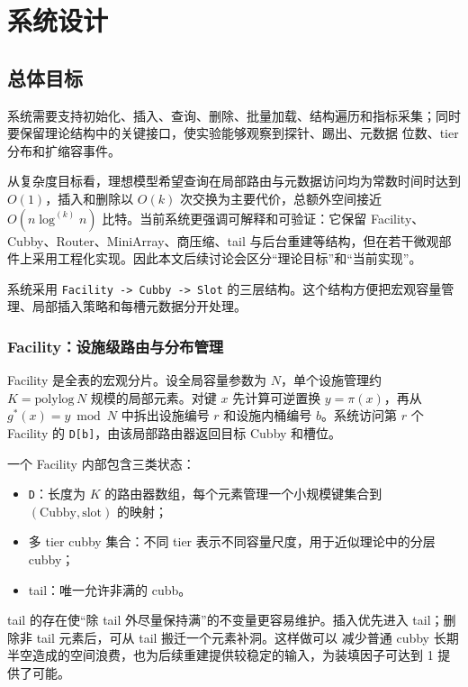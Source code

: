\chapter{系统设计}
\label{ch:design}

\section{总体目标}
系统需要支持初始化、插入、查询、删除、批量加载、结构遍历和指标采集；同时要保留理论结构中的关键接口，使实验能够观察到探针、踢出、元数据
位数、tier 分布和扩缩容事件。

从复杂度目标看，理想模型希望查询在局部路由与元数据访问均为常数时间时达到 \(O(1)\)，插入和删除以 \(O(k)\) 次交换为主要代价，总额外空间接近 \(O(n\log^{(k)}n)\) 比特\cite{pagh2021otsh}。当前系统更强调可解释和可验证：它保留 Facility、Cubby、Router、MiniArray、商压缩、tail 与后台重建等结构，但在若干微观部件上采用工程化实现。因此本文后续讨论会区分“理论目标”和“当前实现”。

系统采用 \texttt{Facility -> Cubby -> Slot} 的三层结构。这个结构方便把宏观容量管理、局部插入策略和每槽元数据分开处理。

\subsection{Facility：设施级路由与分布管理}
Facility 是全表的宏观分片。设全局容量参数为 \(N\)，单个设施管理约 \(K=\mathrm{polylog}\,N\) 规模的局部元素。对键 \(x\) 先计算可逆置换 \(y=\pi(x)\)，再从 \(g^\ast(x)=y\bmod N\) 中拆出设施编号 \(r\) 和设施内桶编号 \(b\)。系统访问第 \(r\) 个 Facility 的 \texttt{D[b]}，由该局部路由器返回目标 Cubby 和槽位。

一个 Facility 内部包含三类状态：
\begin{itemize}
  \item \texttt{D}：长度为 \(K\) 的路由器数组，每个元素管理一个小规模键集合到 \((\mathrm{Cubby},\mathrm{slot})\) 的映射；
  \item 多 tier cubby 集合：不同 tier 表示不同容量尺度，用于近似理论中的分层 cubby；
  \item tail：唯一允许非满的 cubb。
\end{itemize}

tail 的存在使“除 tail 外尽量保持满”的不变量更容易维护。插入优先进入 tail；删除非 tail 元素后，可从 tail 搬迁一个元素补洞。这样做可以
减少普通 cubby 长期半空造成的空间浪费，也为后续重建提供较稳定的输入，为装填因子可达到 1 提供了可能。


